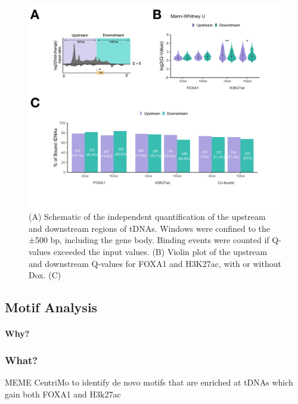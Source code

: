 \documentclass[
  12pt,
]{article}
\begin{document}
\begin{figure}[H]
\includegraphics[width=1\linewidth]{../images/results-04} \caption{(A) Schematic of the independent quantification of the upstream and downstream regions of tDNAs. Windows were confined to the ±500 bp, including the gene body. Binding events were counted if Q-values exceeded the input values. (B) Violin plot of the upstream and downstream Q-values for FOXA1 and H3K27ac, with or without Dox. (C)}\label{fig:results-4}
\end{figure}

\hypertarget{motif-analysis-1}{%
\subsection{Motif Analysis}\label{motif-analysis-1}}

\hypertarget{why}{%
\paragraph{Why?}\label{why}}

\hypertarget{what}{%
\subsubsection{What?}\label{what}}

MEME CentriMo to identify de novo motifs that are enriched at tDNAs which gain both FOXA1 and H3k27ac
\end{document}
